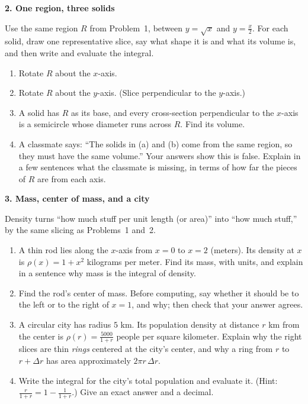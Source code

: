 \documentclass[11pt]{article}
\newcommand{\prob}[1]{\medskip\noindent\textbf{\large #1}\par\smallskip}
\begin{document}
\newpage
\prob{2. One region, three solids}
Use the same region $R$ from Problem~1, between $y=\sqrt x$ and $y=\frac x2$. For each
solid, draw one representative slice, say what shape it is and what its volume is, and
then write and evaluate the integral.
\begin{enumerate}
\item Rotate $R$ about the $x$-axis.

\item Rotate $R$ about the $y$-axis. (Slice perpendicular to the $y$-axis.)

\item A solid has $R$ as its base, and every cross-section perpendicular to the $x$-axis is a
semicircle whose diameter runs across $R$. Find its volume.

\item A classmate says: ``The solids in (a) and (b) come from the same region, so they must have
the same volume.'' Your answers show this is false. Explain in a few sentences what the
classmate is missing, in terms of how far the pieces of $R$ are from each axis.

\end{enumerate}

\newpage
\prob{3. Mass, center of mass, and a city}
Density turns ``how much stuff per unit length (or area)'' into ``how much stuff,'' by the
same slicing as Problems~1 and~2.
\begin{enumerate}
\item A thin rod lies along the $x$-axis from $x=0$ to $x=2$ (meters). Its density at $x$ is
$\rho(x)=1+x^2$ kilograms per meter. Find its mass, with units, and explain in a sentence why
mass is the integral of density.

\item Find the rod's center of mass. Before computing, say whether it should be to the left or to
the right of $x=1$, and why; then check that your answer agrees.

\item A circular city has radius $5$ km. Its population density at distance $r$ km from the center
is $\rho(r)=\frac{5000}{1+r}$ people per square kilometer. Explain why the right slices are
thin \emph{rings} centered at the city's center, and why a ring from $r$ to $r+\Delta r$ has area
approximately $2\pi r\,\Delta r$.

\item Write the integral for the city's total population and evaluate it. (Hint: $\frac r{1+r}=1-\frac1{1+r}$.)
Give an exact answer and a decimal.

\end{enumerate}
\end{document}
